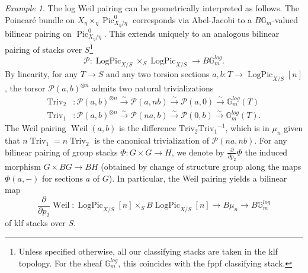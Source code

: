 \documentclass[a4paper,11pt]{amsart} %
\numberwithin{equation}{subsection}
\newcommand{\on}[1]{\operatorname{#1}}
\newcommand{\bb}[1]{{\mathbb{#1}}}
\newcommand{\ca}[1]{{\mathcal{#1}}}
\newcommand{\lra}{\longrightarrow}
\newcommand{\iso}{\stackrel{\sim}{\lra}}
\theoremstyle{definition}
\theoremstyle{plain}%
\theoremstyle{remark}
\newtheorem{example}[definition]{Example}
\begin{document}
\begin{example}
The log Weil pairing can be geometrically interpreted as follows. The Poincar\'e bundle on $X_\eta \times_\eta \on{Pic}^0_{X_\eta/\eta}$ corresponds via Abel-Jacobi to a $B\bb G_m$-valued bilinear pairing on $\on{Pic}^0_{X_\eta/\eta}$. This extends uniquely to an analogous bilinear pairing of stacks over $S$\footnote{Unless specified otherwise, all our classifying stacks are taken in the klf topology. For the sheaf $\bb G_m^{log}$, this coincides with the fppf classifying stack.}
\[
\ca P \colon \on{LogPic}_{X/S}\times_S \on{LogPic}_{X/S} \to B\bb G_m^{log}.
\]
By linearity, for any $T \to S$ and any two torsion sections $a,b \colon T \to \on{LogPic}_{X/S}[n]$, the torsor $\ca P(a,b)^{\otimes n}$ admits two natural trivializations
\begin{align*}
	\on{Triv_2} & \colon \ca P(a,b)^{\otimes n} \iso \ca P(a,nb) \iso \ca P(a,0) \iso \bb G_m^{log}(T) \\
	\on{Triv_1} & \colon \ca P(a,b)^{\otimes n} \iso \ca P(na,b) \iso \ca P(0,b) \iso \bb G_m^{log}(T).
\end{align*}
The Weil pairing $\on{Weil}(a,b)$ is the difference $\on{Triv_2}\on{Triv_1}^{-1}$, which is in $\mu_n$ given that $n\on{Triv}_1=n\on{Triv}_2$ is the canonical trivialization of $\ca P(na,nb)$. For any bilinear pairing of group stacks $\Phi \colon G \times G \to H$, we denote by $\frac{\partial}{\partial p_2}\Phi$ the induced morphism $G \times BG \to BH$ (obtained by change of structure group along the maps $\Phi(a,-)$ for sections $a$ of $G$). In particular, the Weil pairing yields a bilinear map
\[
\frac{\partial}{\partial p_2}\on{Weil} \colon \on{LogPic}_{X/S}[n] \times_S B\on{LogPic}_{X/S}[n] \to B\mu_n \to B\bb G_m^{log}
\]
of klf stacks over $S$.


\end{example}
\end{document}
